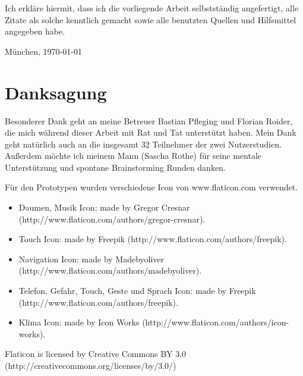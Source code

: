 \documentclass[11pt,a4paper,twoside]{book}
\begin{document}
\vfill %

\noindent Ich erkläre hiermit, dass ich die vorliegende Arbeit
selbstständig angefertigt, alle Zitate als solche kenntlich gemacht
sowie alle benutzten Quellen und Hilfsmittel angegeben habe.

\bigskip\noindent München, \today

\vspace{4ex}\noindent\makebox[7cm]{\dotfill}

\cleardoublepage
\pagestyle{fancy}

\setlength{\parskip}{1pt}
\tableofcontents
\setlength{\parskip}{\baselineskip}


\cleardoublepage

\fancyhead[LE,RO]{\rightmark}
\fancyhead[LO,RE]{\leftmark}
\fancyfoot[LE,RO]{\thepage}
















\chapter{Danksagung}\label{cha:Danksagung}

Besonderer Dank geht an meine Betreuer Bastian Pfleging und Florian Roider, die mich während dieser Arbeit mit Rat und Tat unterstützt haben. Mein Dank geht natürlich auch an die insgesamt 32 Teilnehmer der zwei Nutzerstudien. Außerdem möchte ich meinem Mann (Sascha Rothe) für seine mentale Unterstützung und spontane Brainstorming Runden danken. 

Für den Prototypen wurden verschiedene Icon von www.flaticon.com verwendet. 
\begin{itemize}
	\item Daumen, Musik Icon: made by Gregor Cresnar (http://www.flaticon.com/authors/gregor-cresnar).
	\item Touch Icon: made by Freepik (http://www.flaticon.com/authors/freepik).
	\item Navigation Icon: made by Madebyoliver (http://www.flaticon.com/authors/madebyoliver). 
	\item Telefon, Gefahr, Touch, Geste und Sprach Icon: made by Freepik (http://www.flaticon.com/authors/freepik). 
	\item Klima Icon: made by Icon Works (http://www.flaticon.com/authors/icon-works). 
\end{itemize}
Flaticon is licensed by Creative Commons BY 3.0 (http://creativecommons.org/licenses/by/3.0/)
\end{document}
